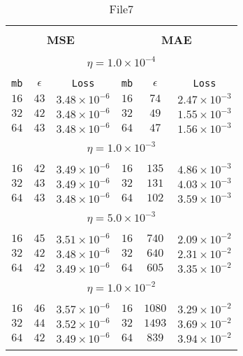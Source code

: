 \documentclass[10pt]{article}
\begin{document}
\begin{table}[]
  \small
  \caption{File7}\label{tab:tab1}
\begin{center}
\begin{tabular}{@{}ccc|ccc@{}}

\hline\\[-11pt]
\hline\\[-6.5pt]
\multicolumn{3}{c}{\bf MSE} & \multicolumn{3}{c}{\bf MAE } \\[5pt]
\hline\\[-11pt]
\multicolumn{6}{c}{$\eta = 1.0\times 10^{-4}$} \\[5pt]
\hline\\[-11pt]
\texttt{mb} & \texttt{$\epsilon$} & \texttt{Loss} & \texttt{mb} & \texttt{$\epsilon$} & \texttt{Loss} \\[1pt]
$16$ & $43$ & $3.48\times 10^{-6}$  &   $16$ & $74$ & $2.47\times 10^{-3}$   \\ [1pt]
$32$ & $42$ & $3.48\times 10^{-6}$  &   $32$ & $49$ & $1.55\times 10^{-3}$   \\ [1pt]
$64$ & $43$ & $3.48\times 10^{-6}$  &   $64$ & $47$ & $1.56\times 10^{-3}$   \\ [1pt]

\hline\\[-11pt]
\multicolumn{6}{c}{$\eta = 1.0\times 10^{-3}$} \\[5pt]
\hline\\[-11pt]
$16$ & $42$ & $3.49\times 10^{-6}$  &   $16$ & $135$ & $4.86\times 10^{-3}$  \\ [1pt]
$32$ & $43$ & $3.49\times 10^{-6}$  &   $32$ & $131$ & $4.03\times 10^{-3}$  \\ [1pt]
$64$ & $43$ & $3.48\times 10^{-6}$  &   $64$ & $102$ & $3.59\times 10^{-3}$  \\ [1pt]
\hline\\[-11pt]
\multicolumn{6}{c}{$\eta = 5.0\times 10^{-3}$} \\[5pt]
\hline\\[-11pt]
$16$ & $45$ & $3.51\times 10^{-6}$  &   $16$ & $740$ & $2.09\times 10^{-2}$  \\ [1pt]
$32$ & $42$ & $3.48\times 10^{-6}$  &   $32$ & $640$ & $2.31\times 10^{-2}$  \\ [1pt]
$64$ & $42$ & $3.49\times 10^{-6}$  &   $64$ & $605$ & $3.35\times 10^{-2}$  \\ [1pt]

\hline\\[-11pt]

\multicolumn{6}{c}{$\eta = 1.0\times 10^{-2}$} \\[5pt]
\hline\\[-11pt]
$16$ & $46$ & $3.57\times 10^{-6}$  &   $16$ & $1080$ & $3.29\times 10^{-2}$ \\ [1pt]
$32$ & $44$ & $3.52\times 10^{-6}$  &   $32$ & $1493$ & $3.69\times 10^{-2}$ \\ [1pt]
$64$ & $42$ & $3.49\times 10^{-6}$  &   $64$ & $839$ & $3.94\times 10^{-2}$  \\ [1pt]
\hline\\[-11pt]


\end{tabular}
\end{center}
\end{table}
\end{document}
